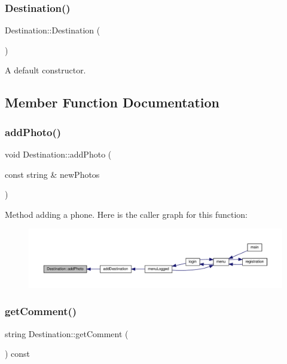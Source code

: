 \subsubsection{\texorpdfstring{Destination()}{Destination()}}
{\footnotesize\ttfamily Destination\+::\+Destination (\begin{DoxyParamCaption}{ }\end{DoxyParamCaption})\hspace{0.3cm}{\ttfamily [inline]}}

A default constructor. 

\subsection{Member Function Documentation}
\mbox{\label{class_destination_a6494a9eae34083fd09861ba8f6923e92}} 
\subsubsection{\texorpdfstring{add\+Photo()}{addPhoto()}}
{\footnotesize\ttfamily void Destination\+::add\+Photo (\begin{DoxyParamCaption}\item[{const string \&}]{new\+Photos }\end{DoxyParamCaption})}

Method adding a phone. Here is the caller graph for this function\+:\nopagebreak
\begin{figure}[H]
\begin{center}
\leavevmode
\includegraphics[width=350pt]{class_destination_a6494a9eae34083fd09861ba8f6923e92_icgraph}
\end{center}
\end{figure}
\mbox{\label{class_destination_a4d20ef4e561fa10dd81561b9cd61c55c}} 
\subsubsection{\texorpdfstring{get\+Comment()}{getComment()}}
{\footnotesize\ttfamily string Destination\+::get\+Comment (\begin{DoxyParamCaption}{ }\end{DoxyParamCaption}) const\hspace{0.3cm}{\ttfamily [inline]}}


